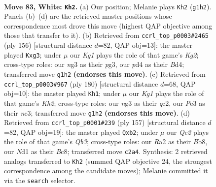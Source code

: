 \documentclass[11pt]{article}
\begin{document}
\clearpage

\begin{figure}[p]\centering
\begin{subfigure}{0.46\textwidth}\centering
\resizebox{\linewidth}{!}{%
\newchessgame
\chessboard[
  setfen={8/6k1/8/Pqp2p2/3p1Ppb/4P1n1/R1QB4/1r1N2K1 w - - 9 83},
  showmover=false,
  pgfstyle=straightmove, color=movearrow, markmove={g1-h2}
]}
\caption{}
\end{subfigure}\hfill
\begin{subfigure}{0.46\textwidth}\centering
\resizebox{\linewidth}{!}{%
\newchessgame
\chessboard[
  setfen={8/R5bk/4p3/1p1pr1P1/1P1B4/2P2Qp1/2q3K1/8 w - - 2 79},
  showmover=false,
  pgfstyle=straightmove, color=movearrow, markmove={g2-g3}
]}
\caption{}
\end{subfigure}
\\[4pt]
\begin{subfigure}{0.46\textwidth}\centering
\resizebox{\linewidth}{!}{%
\newchessgame
\chessboard[
  setfen={1r6/8/kp1Qp3/3pP1P1/p1p2P2/P1n1B2R/2q4K/8 w - - 8 91},
  showmover=false,
  pgfstyle=straightmove, color=movearrow, markmove={h2-h1}
]}
\caption{}
\end{subfigure}\hfill
\begin{subfigure}{0.46\textwidth}\centering
\resizebox{\linewidth}{!}{%
\newchessgame
\chessboard[
  setfen={1bb5/6k1/1q3p2/3pp2p/Q2N3P/P1P3P1/1P6/4R2K b - - 0 79},
  showmover=false,
  pgfstyle=straightmove, color=movearrow, markmove={b6-b2}
]}
\caption{}
\end{subfigure}
\caption{\textbf{Move 83, White: \texttt{Kh2}.} (a) Our position; Melanie plays \texttt{Kh2} (\texttt{g1h2}). Panels (b)--(d) are the retrieved master positions whose correspondence most drove this move (highest QAP objective among those that transfer to it). (b) Retrieved from \texttt{ccrl\_top\_p0003\#2465} (ply 156) [structural distance $d$=82, QAP obj=13]: the master played \texttt{Kxg3}; under $\mu$ our \emph{Kg1} plays the role of that game's \emph{Kg2}; cross-type roles: our \emph{n}g3 as their \emph{p}g3, our \emph{p}d4 as their \emph{B}d4; transferred move \texttt{g1h2} \textbf{(endorses this move)}. (c) Retrieved from \texttt{ccrl\_top\_p0003\#967} (ply 180) [structural distance $d$=68, QAP obj=10]: the master played \texttt{Kh1}; under $\mu$ our \emph{Kg1} plays the role of that game's \emph{Kh2}; cross-type roles: our \emph{n}g3 as their \emph{q}c2, our \emph{P}e3 as their \emph{n}c3; transferred move \texttt{g1h2} \textbf{(endorses this move)}. (d) Retrieved from \texttt{ccrl\_top\_p0001\#239} (ply 157) [structural distance $d$=82, QAP obj=19]: the master played \texttt{Qxb2}; under $\mu$ our \emph{Qc2} plays the role of that game's \emph{Qb3}; cross-type roles: our \emph{R}a2 as their \emph{B}b8, our \emph{N}d1 as their \emph{B}c8; transferred move \texttt{c2a4}. Synthesis: 2 retrieved analogs transferred to \texttt{Kh2} (summed QAP objective 24, the strongest correspondence among the candidate moves); Melanie committed it via the \texttt{search} selector.}
\label{fig:thought-m164}
\end{figure}
\end{document}

